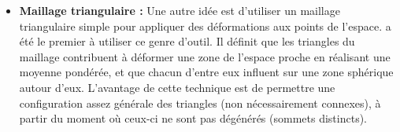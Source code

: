 \begin{itemize}
\item{\textbf{Maillage triangulaire :}} Une autre idée est d'utiliser
  un maillage triangulaire simple pour appliquer des déformations aux
  points de l'espace. \cite{KO03} a été le premier à utiliser ce genre
  d'outil. Il définit que les triangles du maillage contribuent à
  déformer une zone de l'espace proche en réalisant une moyenne
  pondérée, et que chacun d'entre eux influent sur une zone sphérique
  autour d'eux. L'avantage de cette technique est de permettre une
  configuration assez générale des triangles (non nécessairement
  connexes), à partir du moment où ceux-ci ne sont pas dégénérés
  (sommets distincts).

\end{itemize}
